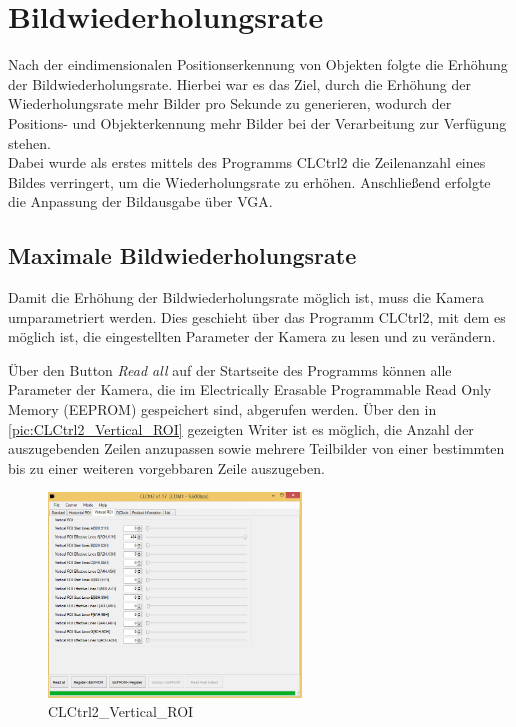 \documentclass[ngerman,12pt]{article} %
\begin{document}
{%
\section{Bildwiederholungsrate}
\label{sec:Bildwiederholungsrate}
Nach der eindimensionalen Positionserkennung von Objekten folgte die Erhöhung der Bildwiederholungsrate. Hierbei war es das Ziel, durch die Erhöhung der Wiederholungsrate mehr Bilder pro Sekunde zu generieren, wodurch der Positions- und Objekterkennung mehr Bilder bei der Verarbeitung zur Verfügung stehen.\\
Dabei wurde als erstes mittels des Programms CLCtrl2 die Zeilenanzahl eines Bildes verringert, um die Wiederholungsrate zu erhöhen. Anschließend erfolgte die Anpassung der Bildausgabe über VGA.

\subsection{Maximale Bildwiederholungsrate}
\label{Maximale Bildwiederholungsrate}
Damit die Erhöhung der Bildwiederholungsrate möglich ist, muss die Kamera umparametriert werden. Dies geschieht über das Programm CLCtrl2, mit dem es möglich ist, die eingestellten Parameter der Kamera zu lesen und zu verändern.\newline

Über den Button \textit{Read all} auf der Startseite des Programms können alle Parameter der Kamera, die im Electrically Erasable Programmable Read Only Memory (EEPROM) gespeichert sind, abgerufen werden. Über den in \autoref{pic:CLCtrl2_Vertical_ROI} gezeigten Writer ist es möglich, die Anzahl der auszugebenden Zeilen anzupassen sowie mehrere Teilbilder von einer bestimmten bis zu einer weiteren vorgebbaren Zeile auszugeben.

\begin{figure}[htbp]
	\begin{center}
	\includegraphics[width = 0.6\textwidth]{CLCtrl2_vertical_roi_neu}
	\caption[CLCtrl2\_Vertical\_ROI]{\label{pic:CLCtrl2_Vertical_ROI}CLCtrl2\_Vertical\_ROI}
	\end{center}
\end{figure}

}
\end{document}
